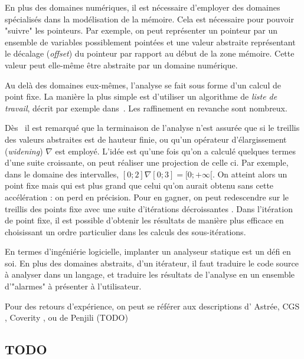 En plus des domaines numériques, il est nécessaire d'employer des domaines
spécialisés dans la modélisation de la mémoire. Cela est nécessaire pour pouvoir
"suivre" les pointeurs. Par exemple, on peut représenter un pointeur par un
ensemble de variables possiblement pointées et une valeur abstraite représentant
le décalage (\emph{offset}) du pointeur par rapport au début de la zone mémoire.
Cette valeur peut elle-même être abstraite par un domaine numérique.

Au delà des domaines eux-mêmes, l'analyse se fait sous forme d'un calcul de
point fixe. La manière la plus simple est d'utiliser un algorithme de
\emph{liste de travail}, décrit par exemple dans~\cite{tapsoft95}. Les
raffinement en revanche sont nombreux.

Dès~\cite{Cousot77} il est remarqué que la terminaison de l'analyse n'est
assurée que si le treillis des valeurs abstraites est de hauteur finie, ou qu'un
opérateur d'élargissement (\emph{widening}) $\nabla$ est employé. L'idée est
qu'une fois qu'on a calculé quelques termes d'une suite croissante, on peut
réaliser une projection de celle ci. Par exemple, dans le domaine des
intervalles, $[0;2] \nabla [0;3] = [0;+\infty[$. On atteint alors un point fixe
mais qui est plus grand que celui qu'on aurait obtenu sans cette accélération :
on perd en précision. Pour en gagner, on peut redescendre sur le treillis des
points fixe avec une suite d'itérations décroissantes \cite{granger}. Dans
l'itération de point fixe, il est possible d'obtenir les résultats de manière
plus efficace en choisissant un ordre particulier dans les calculs des
sous-itérations\cite{policy}.


En termes d'ingéniérie logicielle, implanter un analyseur statique est un défi
en soi. En plus des domaines abstraits, d'un itérateur, il faut traduire le code
source à analyser dans un langage, et traduire les résultats de l'analyse en un
ensemble d'"alarmes" à présenter à l'utilisateur.

Pour des retours d'expérience, on peut se référer aux descriptions d'
Astrée\cite{Astree04,Astree05,AstreeScale},
CGS \cite{cgs},
Coverity \cite{coverityBillion},
ou de Penjili (TODO)


\subsection*{TODO}

